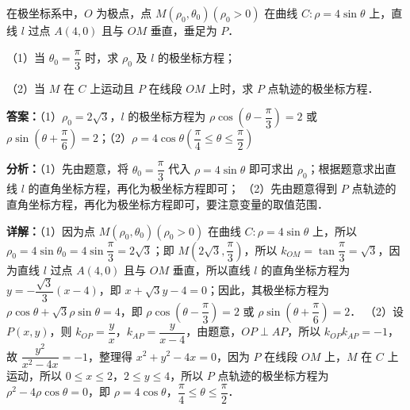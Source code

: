 \begin{question}[points=10]
[选修 4-4：坐标系与参数方程]

在极坐标系中，$O$ 为极点，点 $M(\rho_0,\theta_0)(\rho_0>0)$ 在曲线 $C:\rho=4\sin\theta$ 上，直线 $l$ 过点 $A(4,0)$ 且与 $OM$ 垂直，垂足为 $P$．

（1）当 $\theta_0=\dfrac{\pi}{3}$ 时，求 $\rho_0$ 及 $l$ 的极坐标方程；

（2）当 $M$ 在 $C$ 上运动且 $P$ 在线段 $OM$ 上时，求 $P$ 点轨迹的极坐标方程．
\begin{solution}
\textbf{答案：}（1）$\rho_0=2\sqrt{3}$，$l$ 的极坐标方程为 $\rho\cos\left(\theta-\dfrac{\pi}{3}\right)=2$ 或 $\rho\sin\left(\theta+\dfrac{\pi}{6}\right)=2$；（2）$\rho=4\cos\theta\left(\dfrac{\pi}{4}\le\theta\le\dfrac{\pi}{2}\right)$

\textbf{分析：}（1）先由题意，将 $\theta_0=\dfrac{\pi}{3}$ 代入 $\rho=4\sin\theta$ 即可求出 $\rho_0$；根据题意求出直线 $l$ 的直角坐标方程，再化为极坐标方程即可；
（2）先由题意得到 $P$ 点轨迹的直角坐标方程，再化为极坐标方程即可，要注意变量的取值范围．

\textbf{详解：}（1）因为点 $M(\rho_0,\theta_0)(\rho_0>0)$ 在曲线 $C:\rho=4\sin\theta$ 上，所以 $\rho_0=4\sin\theta_0=4\sin\dfrac{\pi}{3}=2\sqrt{3}$；即 $M\left(2\sqrt{3},\dfrac{\pi}{3}\right)$，所以 $k_{OM}=\tan\dfrac{\pi}{3}=\sqrt{3}$，因为直线 $l$ 过点 $A(4,0)$ 且与 $OM$ 垂直，所以直线 $l$ 的直角坐标方程为 $y=-\dfrac{\sqrt{3}}{3}(x-4)$，即 $x+\sqrt{3}y-4=0$；因此，其极坐标方程为 $\rho\cos\theta+\sqrt{3}\rho\sin\theta=4$，即 $\rho\cos\left(\theta-\dfrac{\pi}{3}\right)=2$ 或 $\rho\sin\left(\theta+\dfrac{\pi}{6}\right)=2$．
（2）设 $P(x,y)$，则 $k_{OP}=\dfrac{y}{x}$，$k_{AP}=\dfrac{y}{x-4}$，由题意，$OP\perp AP$，所以 $k_{OP}k_{AP}=-1$，故 $\dfrac{y^2}{x^2-4x}=-1$，整理得 $x^2+y^2-4x=0$，因为 $P$ 在线段 $OM$ 上，$M$ 在 $C$ 上运动，所以 $0\le x\le2$，$2\le y\le4$，所以 $P$ 点轨迹的极坐标方程为 $\rho^2-4\rho\cos\theta=0$，即 $\rho=4\cos\theta$，$\dfrac{\pi}{4}\le\theta\le\dfrac{\pi}{2}$．
\end{solution}
\end{question}

